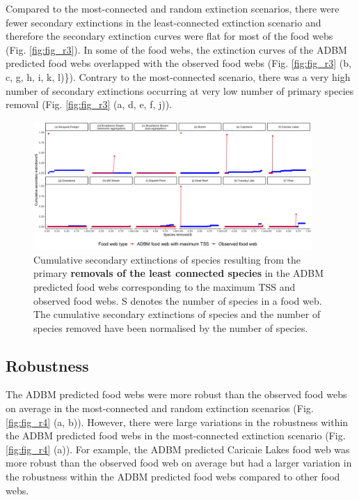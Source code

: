 \documentclass{article}
\begin{document}
Compared to the most-connected and random extinction scenarios, there
were fewer secondary extinctions in the least-connected extinction
scenario and therefore the secondary extinction curves were flat for
most of the food webs (Fig. \ref{fig:fig_r3}). In some of the food webs,
the extinction curves of the ADBM predicted food webs overlapped with
the observed food webs (Fig. \ref{fig:fig_r3} (b, c, g, h, i, k, l)\}).
Contrary to the most-connected scenario, there was a very high number of
secondary extinctions occurring at very low number of primary species
removal (Fig. \ref{fig:fig_r3} (a, d, e, f, j)).

\begin{figure}

{\centering \includegraphics[width=400px]{../results/plot_leastconnected_maxTSS} 

}

\caption{\label{fig:fig_r3} Cumulative secondary extinctions of species resulting from the primary \textbf{removals of the least connected species} in the ADBM predicted food webs corresponding to the maximum TSS and observed food webs. S denotes the number of species in a food web. The cumulative secondary extinctions of species and the number of species removed have been normalised by the number of species.}\label{fig:unnamed-chunk-4}
\end{figure}

\hypertarget{robustness}{%
\subsection{Robustness}\label{robustness}}

The ADBM predicted food webs were more robust than the observed food
webs on average in the most-connected and random extinction scenarios
(Fig. \ref{fig:fig_r4} (a, b)). However, there were large variations in
the robustness within the ADBM predicted food webs in the most-connected
extinction scenario (Fig. \ref{fig:fig_r4} (a)). For example, the ADBM
predicted Caricaie Lakes food web was more robust than the observed food
web on average but had a larger variation in the robustness within the
ADBM predicted food webs compared to other food webs.
\end{document}
